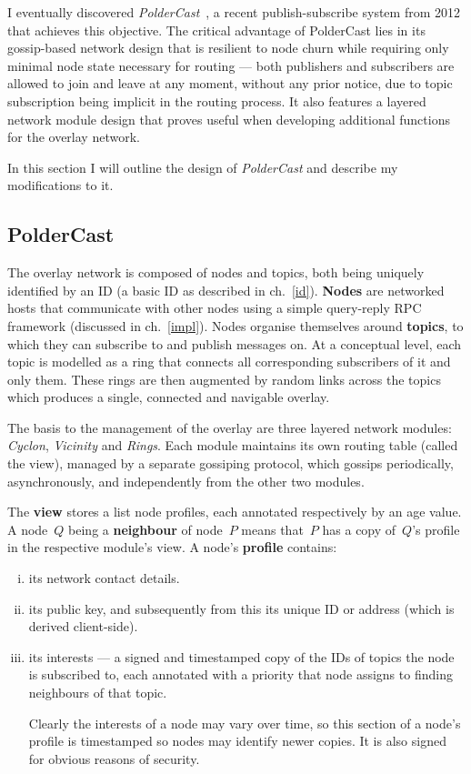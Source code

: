 \documentclass[10pt,a4paper,onecolumn]{article}
\begin{document}
I eventually discovered \textit{PolderCast}~\cite{poldercast}, a recent publish-subscribe system from 2012 that achieves this objective. The critical advantage of PolderCast lies in its gossip-based network design that is resilient to node churn while requiring only minimal node state necessary for routing — both publishers and subscribers are allowed to join and leave at any moment, without any prior notice, due to topic subscription being implicit in the routing process. It also features a layered network module design that proves useful when developing additional functions for the overlay network.

In this section I will outline the design of \textit{PolderCast} and describe my modifications to it.

\subsection{PolderCast}
The overlay network is composed of nodes and topics, both being uniquely identified by an ID (a basic ID as described in ch.~\ref{id}). \textbf{Nodes} are networked hosts that communicate with other nodes using a simple query-reply RPC framework (discussed in ch.~\ref{impl}). Nodes organise themselves around \textbf{topics}, to which they can subscribe to and publish messages on. At a conceptual level, each topic is modelled as a ring that connects all corresponding subscribers of it and only them. These rings are then augmented by random links across the topics which produces a single, connected and navigable overlay. 

The basis to the management of the overlay are three layered network modules: \emph{Cyclon}, \emph{Vicinity} and \emph{Rings}. Each module maintains its own routing table (called the view), managed by a separate gossiping protocol, which gossips periodically, asynchronously, and independently from the other two modules.

The \textbf{view} stores a list node profiles, each annotated respectively by an age value. A node~$Q$ being a \textbf{neighbour} of node~$P$ means that~$P$ has a copy of~$Q$'s profile in the respective module's view. A node's \textbf{profile} contains:
\begin{enumerate}[i.]
\item its network contact details.
\item its public key, and subsequently from this its unique ID or address (which is derived client-side).
\item its interests — a signed and timestamped copy of the IDs of topics the node is subscribed to, each annotated with a priority that node assigns to finding neighbours of that topic. 

Clearly the interests of a node may vary over time, so this section of a node's profile is timestamped so nodes may identify newer copies. It is also signed for obvious reasons of security.
\end{enumerate}
\end{document}
